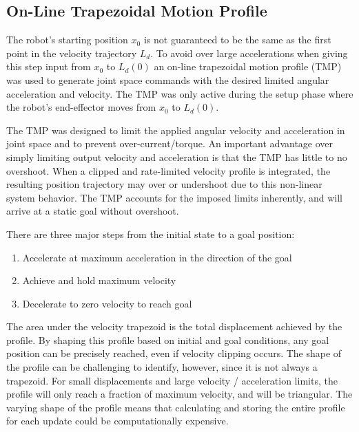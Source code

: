 \subsection{On-Line Trapezoidal Motion Profile}\label{sec:trap}

The robot's starting position $x_0$ is not guaranteed to be the same as the
first point in the velocity trajectory $L_d$.  To avoid over large
accelerations when giving this step input from $x_0$ to $L_d(0)$ an on-line
trapezoidal motion profile (TMP) was used to generate joint space commands with
the desired limited angular acceleration and velocity.  The TMP was only active
during the setup phase where the robot's end-effector moves from $x_0$ to
$L_d(0)$.

The TMP was designed to limit the applied angular velocity and acceleration in
joint space and to prevent over-current/torque. An important advantage over
simply limiting output velocity and acceleration is that the TMP has little to
no overshoot. When a clipped and rate-limited velocity profile is integrated,
the resulting position trajectory may over or undershoot due to this non-linear
system behavior.  The TMP accounts for the imposed limits inherently, and will
arrive at a static goal without overshoot.

There are three major steps from the initial state to a goal position:

\begin{enumerate}
\item Accelerate at maximum acceleration in the direction of the goal
\item Achieve and hold maximum velocity
\item Decelerate to zero velocity to reach goal
\end{enumerate}

The area under the velocity trapezoid is the total displacement achieved by the
profile. By shaping this profile based on initial and goal conditions, any
goal position can be precisely reached, even if velocity clipping occurs. The
shape of the profile can be challenging to identify, however, since it is not
always a trapezoid. For small displacements and large velocity / acceleration
limits, the profile will only reach a fraction of maximum velocity, and will be
triangular. The varying shape of the profile means that calculating and storing
the entire profile for each update could be computationally expensive. 

